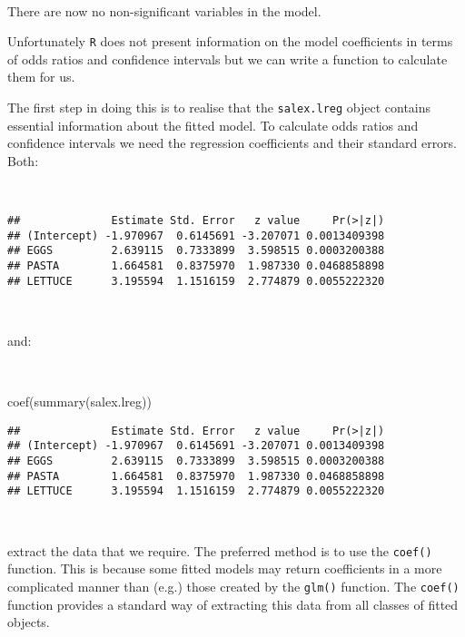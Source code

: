 \documentclass[
  12pt,
  a4paper]{book}
\newenvironment{Shaded}{\begin{snugshade}}{\end{snugshade}}
\newcommand{\FunctionTok}[1]{\textcolor[rgb]{0.00,0.00,0.00}{#1}}
\newcommand{\NormalTok}[1]{#1}
\newcommand{\SpecialCharTok}[1]{\textcolor[rgb]{0.00,0.00,0.00}{#1}}
\begin{document}
~

There are now no non-significant variables in the model.

\newpage

Unfortunately \texttt{R} does not present information on the model coefficients in terms of odds ratios and confidence intervals but we can write a function to calculate them for us.

The first step in doing this is to realise that the \texttt{salex.lreg} object contains essential information about the fitted model. To calculate odds ratios and confidence intervals we need the regression coefficients and their standard errors. Both:

~

\begin{Shaded}
\end{Shaded}

\begin{verbatim}
##              Estimate Std. Error   z value     Pr(>|z|)
## (Intercept) -1.970967  0.6145691 -3.207071 0.0013409398
## EGGS         2.639115  0.7333899  3.598515 0.0003200388
## PASTA        1.664581  0.8375970  1.987330 0.0468858898
## LETTUCE      3.195594  1.1516159  2.774879 0.0055222320
\end{verbatim}

~

and:

~

\begin{Shaded}
\begin{Highlighting}[]
\FunctionTok{coef}\NormalTok{(}\FunctionTok{summary}\NormalTok{(salex.lreg))}
\end{Highlighting}
\end{Shaded}

\begin{verbatim}
##              Estimate Std. Error   z value     Pr(>|z|)
## (Intercept) -1.970967  0.6145691 -3.207071 0.0013409398
## EGGS         2.639115  0.7333899  3.598515 0.0003200388
## PASTA        1.664581  0.8375970  1.987330 0.0468858898
## LETTUCE      3.195594  1.1516159  2.774879 0.0055222320
\end{verbatim}

~

extract the data that we require. The preferred method is to use the \texttt{coef()} function. This is because some fitted models may return coefficients in a more complicated manner than (e.g.) those created by the \texttt{glm()} function. The \texttt{coef()} function provides a standard way of extracting this data from all classes of fitted objects.
\end{document}
